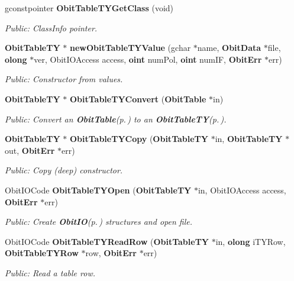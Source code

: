 \begin{CompactItemize}
gconstpointer {\bf Obit\-Table\-TYGet\-Class} (void)
\begin{CompactList}\small\item\em Public: Class\-Info pointer. \item\end{CompactList}\item 
{\bf Obit\-Table\-TY} $\ast$ {\bf new\-Obit\-Table\-TYValue} (gchar $\ast$name, {\bf Obit\-Data} $\ast$file, {\bf olong} $\ast$ver, Obit\-IOAccess access, {\bf oint} num\-Pol, {\bf oint} num\-IF, {\bf Obit\-Err} $\ast$err)
\begin{CompactList}\small\item\em Public: Constructor from values. \item\end{CompactList}\item 
{\bf Obit\-Table\-TY} $\ast$ {\bf Obit\-Table\-TYConvert} ({\bf Obit\-Table} $\ast$in)
\begin{CompactList}\small\item\em Public: Convert an {\bf Obit\-Table}{\rm (p.\,\pageref{structObitTable})} to an {\bf Obit\-Table\-TY}{\rm (p.\,\pageref{structObitTableTY})}. \item\end{CompactList}\item 
{\bf Obit\-Table\-TY} $\ast$ {\bf Obit\-Table\-TYCopy} ({\bf Obit\-Table\-TY} $\ast$in, {\bf Obit\-Table\-TY} $\ast$out, {\bf Obit\-Err} $\ast$err)
\begin{CompactList}\small\item\em Public: Copy (deep) constructor. \item\end{CompactList}\item 
Obit\-IOCode {\bf Obit\-Table\-TYOpen} ({\bf Obit\-Table\-TY} $\ast$in, Obit\-IOAccess access, {\bf Obit\-Err} $\ast$err)
\begin{CompactList}\small\item\em Public: Create {\bf Obit\-IO}{\rm (p.\,\pageref{structObitIO})} structures and open file. \item\end{CompactList}\item 
Obit\-IOCode {\bf Obit\-Table\-TYRead\-Row} ({\bf Obit\-Table\-TY} $\ast$in, {\bf olong} i\-TYRow, {\bf Obit\-Table\-TYRow} $\ast$row, {\bf Obit\-Err} $\ast$err)
\begin{CompactList}\small\item\em Public: Read a table row. \item\end{CompactList}\item 

\end{CompactItemize}
